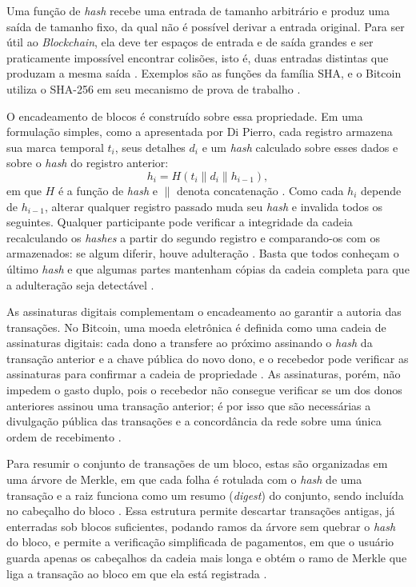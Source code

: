 Uma função de \textit{hash} recebe uma entrada de tamanho arbitrário e produz uma saída de tamanho fixo, da qual não é possível derivar a entrada original. Para ser útil ao \textit{Blockchain}, ela deve ter espaços de entrada e de saída grandes e ser praticamente impossível encontrar colisões, isto é, duas entradas distintas que produzam a mesma saída \cite{di2017blockchain}. Exemplos são as funções da família SHA, e o Bitcoin utiliza o SHA-256 em seu mecanismo de prova de trabalho \cite{di2017blockchain,nakamoto2008bitcoin}.

O encadeamento de blocos é construído sobre essa propriedade. Em uma formulação simples, como a apresentada por Di Pierro, cada registro armazena sua marca temporal $t_i$, seus detalhes $d_i$ e um \textit{hash} calculado sobre esses dados e sobre o \textit{hash} do registro anterior:
\begin{equation}
    h_i = H(t_i \parallel d_i \parallel h_{i-1}),
    \label{eq:hash-chain}
\end{equation}
em que $H$ é a função de \textit{hash} e $\parallel$ denota concatenação \cite{di2017blockchain}. Como cada $h_i$ depende de $h_{i-1}$, alterar qualquer registro passado muda seu \textit{hash} e invalida todos os seguintes. Qualquer participante pode verificar a integridade da cadeia recalculando os \textit{hashes} a partir do segundo registro e comparando-os com os armazenados: se algum diferir, houve adulteração \cite{di2017blockchain}. Basta que todos conheçam o último \textit{hash} e que algumas partes mantenham cópias da cadeia completa para que a adulteração seja detectável \cite{di2017blockchain}.

As assinaturas digitais complementam o encadeamento ao garantir a autoria das transações. No Bitcoin, uma moeda eletrônica é definida como uma cadeia de assinaturas digitais: cada dono a transfere ao próximo assinando o \textit{hash} da transação anterior e a chave pública do novo dono, e o recebedor pode verificar as assinaturas para confirmar a cadeia de propriedade \cite{nakamoto2008bitcoin}. As assinaturas, porém, não impedem o gasto duplo, pois o recebedor não consegue verificar se um dos donos anteriores assinou uma transação anterior; é por isso que são necessárias a divulgação pública das transações e a concordância da rede sobre uma única ordem de recebimento \cite{nakamoto2008bitcoin}.

Para resumir o conjunto de transações de um bloco, estas são organizadas em uma árvore de Merkle, em que cada folha é rotulada com o \textit{hash} de uma transação e a raiz funciona como um resumo (\textit{digest}) do conjunto, sendo incluída no cabeçalho do bloco \cite{Xiao2020,nakamoto2008bitcoin}. Essa estrutura permite descartar transações antigas, já enterradas sob blocos suficientes, podando ramos da árvore sem quebrar o \textit{hash} do bloco, e permite a verificação simplificada de pagamentos, em que o usuário guarda apenas os cabeçalhos da cadeia mais longa e obtém o ramo de Merkle que liga a transação ao bloco em que ela está registrada \cite{nakamoto2008bitcoin}.

